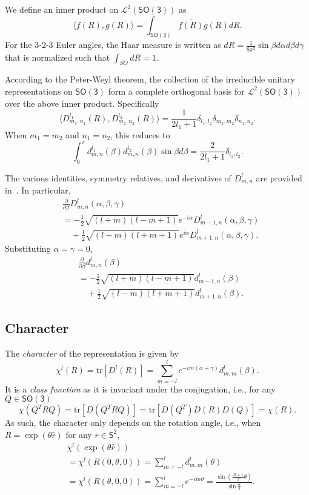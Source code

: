 \documentclass[onecolumn,11pt]{IEEEtran}
\newcommand{\pair}[1]{\ensuremath{\langle #1 \rangle}}
\newcommand{\trs}[1]{\mathrm{tr}\ensuremath{[#1]}}
\newcommand{\deriv}[2]{\ensuremath{\frac{\partial #1}{\partial #2}}}
\newcommand{\SO}{\ensuremath{\mathsf{SO(3)}}}
\newcommand{\Sph}{\ensuremath{\mathsf{S}}}
\begin{document}
We define an inner product on $\mathcal{L}^2(\SO)$ as
\[
    \pair{f(R),g(R)}=\int_{\SO} \overline{f(R)} g(R) dR.
\]
For the 3-2-3 Euler angles, the Haar measure is written as $dR = \frac{1}{8\pi^2}\sin\beta d\alpha d\beta d\gamma$ that is normalized such that $\int_{SO} dR = 1$. 

According to the Peter-Weyl theorem, the collection of the irreducible unitary representations on $\SO$ form a complete orthogonal basis for $\mathcal{L}^2(\SO)$ over the above inner product. 
Specifically
\begin{equation}
\pair{ D^{l_1}_{m_1,n_1}(R), D^{l_2}_{m_2,n_2}(R)} = \frac{1}{2l_1+1}\delta_{l_1,l_2}\delta_{m_1,m_2}\delta_{n_1,n_2}. \label{eqn:D_ortho}
\end{equation}
When $m_1=m_2$ and $n_1=n_2$, this reduces to
\[
\int_{0}^\pi d^{l_1}_{m,n}(\beta)d^{l_2}_{m,n}(\beta)\sin\beta d\beta = \frac{2}{2l_1+1}\delta_{l_1,l_2}. 
\]

The various identities, symmetry relatives, and derivatives of $D^{l}_{m,n}$ are provided in~\cite{VarMos88}. 
In particular,
\begin{align}
&\deriv{}{\beta} D^l_{m,n}(\alpha,\beta,\gamma)\nonumber\\
& = -\frac{1}{2}\sqrt{(l+m)(l-m+1)}e^{-i\alpha} D^l_{m-1,n}(\alpha,\beta,\gamma)\nonumber\\
& \quad + \frac{1}{2}\sqrt{(l-m)(l+m+1)}e^{i\alpha} D^l_{m+1,n}(\alpha,\beta,\gamma).\label{eqn:dD_dbeta}
\end{align}
Substituting $\alpha=\gamma=0$,
\begin{align}
&\deriv{}{\beta} d^l_{m,n}(\beta)\nonumber\\
& = -\frac{1}{2}\sqrt{(l+m)(l-m+1)} d^l_{m-1,n}(\beta)\nonumber\\
& \quad + \frac{1}{2}\sqrt{(l-m)(l+m+1)} d^l_{m+1,n}(\beta).\label{eqn:dd_dbeta}
\end{align}


\subsection{Character}

The \textit{character} of the representation is given by
\[
\chi^l(R) = \trs{D^l(R)}=\sum_{m=-l}^l e^{-im(\alpha+\gamma)} d^l_{m,m}(\beta).
\]
It is a \textit{class function} as it is invariant under the conjugation, i.e., for any $Q\in\SO$
\[
\chi(Q^T R Q) = \trs{D(Q^T R Q)}=\trs{D(Q^T)D(R)D(Q)}=\chi(R).
\]
As such, the character only depends on the rotation angle, i.e., when $R=\exp(\theta\hat r)$ for any $r\in\Sph^2$, 
\begin{align*}
&\chi^l(\exp(\theta\hat r))\\
&= \chi^l{(R(0,\theta,0))}= \sum_{m=-l}^l d^l_{m,m}(\theta)\\
&= \chi^l{(R(\theta,0,0))}= \sum_{m=-l}^l e^{-im\theta}
=\frac{\sin(\frac{2l+1}{2}\theta)}{\sin\frac{\theta}{2}}.
\end{align*}
\end{document}
